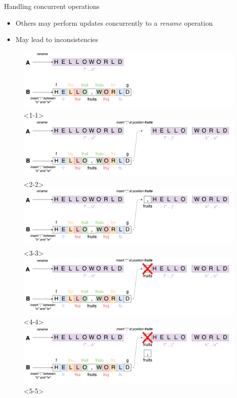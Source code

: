 \documentclass[10pt]{beamer}
\begin{document}
\begin{frame}{Handling concurrent operations}
  \begin{itemize}
    \item Others may perform updates concurrently to a \emph{rename} operation
    \item<4-> May lead to inconsistencies
  \end{itemize}
  \begin{figure}
    \includegraphics[scale=0.08]{img/concurrent-insert-rename-1.png}<1-1>
    \includegraphics[scale=0.08]{img/concurrent-insert-rename-2.png}<2-2>
    \includegraphics[scale=0.08]{img/concurrent-insert-rename-3.png}<3-3>
    \includegraphics[scale=0.08]{img/concurrent-insert-rename-4.png}<4-4>
    \includegraphics[scale=0.08]{img/concurrent-insert-rename-5.png}<5-5>

\end{figure}
\end{frame}
\end{document}
